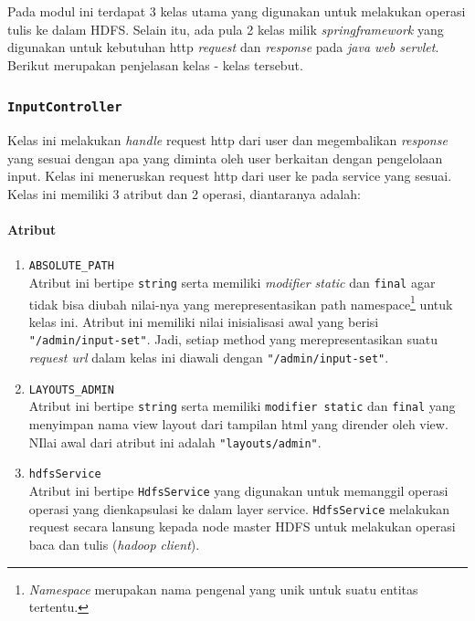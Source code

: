 Pada modul ini terdapat 3 kelas utama yang digunakan untuk melakukan operasi tulis ke dalam HDFS. Selain itu, ada pula 2 kelas milik \textit{springframework} yang digunakan untuk kebutuhan http \textit{request} dan \textit{response} pada \textit{java web servlet}. Berikut merupakan penjelasan kelas - kelas tersebut.
\subsubsection{\texttt{InputController}}
	Kelas ini melakukan \textit{handle} request http dari user dan megembalikan \textit{response} yang sesuai dengan apa yang diminta oleh user berkaitan dengan pengelolaan input. Kelas ini meneruskan request http dari user ke pada service yang sesuai. Kelas ini memiliki 3 atribut dan 2 operasi, diantaranya adalah:
	
	\paragraph{Atribut}
		\begin{enumerate}
			\item \verb|ABSOLUTE_PATH|\\
			Atribut ini bertipe \texttt{string} serta memiliki \textit{modifier static} dan \texttt{final} agar tidak bisa diubah nilai-nya yang merepresentasikan path namespace\footnote{\textit{Namespace} merupakan nama pengenal yang unik untuk suatu entitas tertentu.} untuk kelas ini. Atribut ini memiliki nilai inisialisasi awal yang berisi \texttt{"/admin/input-set"}. Jadi, setiap method yang merepresentasikan suatu \textit{request url} dalam kelas ini diawali dengan \texttt{"/admin/input-set"}.

			\item \verb|LAYOUTS_ADMIN|\\
			Atribut ini bertipe \texttt{string} serta memiliki \texttt{modifier static} dan \texttt{final} yang menyimpan nama view layout dari tampilan html yang dirender oleh view. NIlai awal dari atribut ini adalah \texttt{"layouts/admin"}.

			\item \texttt{hdfsService}\\
			Atribut ini bertipe \texttt{HdfsService} yang digunakan untuk memanggil operasi operasi yang dienkapsulasi ke dalam layer service. \texttt{HdfsService} melakukan request secara lansung kepada node master HDFS untuk melakukan operasi baca dan tulis (\textit{hadoop client}).

		\end{enumerate}
					
